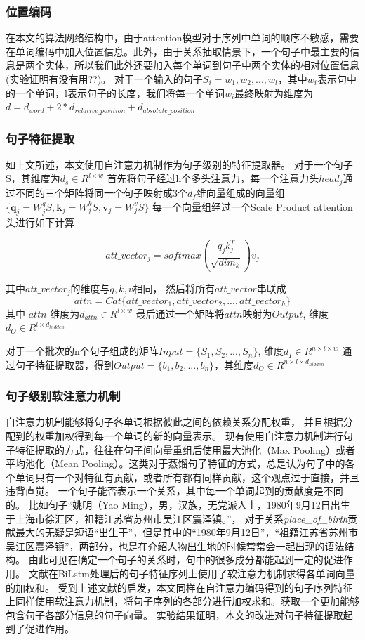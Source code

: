 \documentclass[UTF8]{csoarticle}
\begin{document}
\subsubsection{位置编码}
在本文的算法网络结构中，由于attention模型对于序列中单词的顺序不敏感，需要在单词编码中加入位置信息。此外，由于关系抽取情景下，一个句子中最主要的信息是两个实体，所以我们此外还要加入每个单词到句子中两个实体的相对位置信息(实验证明有没有用??)。
对于一个输入的句子$S_i={w_1, w_2, ..., w_l}$，其中$w_i$表示句中的一个单词，l表示句子的长度，我们将每一个单词$w_i$最终映射为维度为$ d=d_{word} + 2*d_{relative\_position} + d_{absolute\_position}$

\subsubsection{句子特征提取}

如上文所述，本文使用自注意力机制作为句子级别的特征提取器。
对于一个句子S，其维度为$d_s\in R^{l\times w}$
首先将句子经过h个多头注意力，每一个注意力头$head_j$通过不同的三个矩阵将同一个句子映射成3个$d_{f}$维向量组成的向量组$\{\boldsymbol q_j=W_j^{q}S, \boldsymbol k_j=W_j^{k}S, \boldsymbol v_j=W_j^{v}S\}$
每一个向量组经过一个Scale Product attention头进行如下计算

\[ att\_vector_{j} = softmax(\frac{q_{j} k_{j}^{T} }{\sqrt{dim_k}})v_{j}\]

其中$att\_vector_j$的维度与$q, k, v$相同，
然后将所有$att\_vector$串联成
\[attn = Cat\{att\_vector_1,att\_vector_2,...,att\_vector_h\}\]
其中 $attn$ 维度为$d_{attn} \in R^{l\times w}$
最后通过一个矩阵将$attn$映射为$Output$, 维度$d_{O} \in R^{l\times d_{hidden}}$

对于一个批次的n个句子组成的矩阵$Input=\{S_1, S_2,...,S_n\}$, 维度$d_{I} \in R^{n\times l\times w}$
通过句子特征提取器，得到$Output=\{b_1, b_2,...,b_n\}$，其维度$d_{O} \in R^{n\times l\times  d_{hidden}}$

\subsubsection{句子级别软注意力机制}
自注意力机制能够将句子各单词根据彼此之间的依赖关系分配权重，
并且根据分配到的权重加权得到每一个单词的新的向量表示。
现有使用自注意力机制进行句子特征提取的方式，往往在句子间向量重组后使用最大池化（Max Pooling）或者平均池化（Mean Pooling）。这类对于蒸馏句子特征的方式，总是认为句子中的各个单词只有一个对特征有贡献，或者所有都有同样贡献，这个观点过于直接，并且违背直觉。
一个句子能否表示一个关系，其中每一个单词起到的贡献度是不同的。
比如句子“姚明（Yao Ming），男，汉族，无党派人士，1980年9月12日出生于上海市徐汇区，祖籍江苏省苏州市吴江区震泽镇。”，
对于关系\textit{place\_of\_birth}贡献最大的无疑是短语“出生于”，但是其中的“1980年9月12日”，“祖籍江苏省苏州市吴江区震泽镇”，两部分，也是在介绍人物出生地的时候常常会一起出现的语法结构。
由此可见在确定一个句子的关系时，句中的很多成分都能起到一定的促进作用。
文献\cite{bib4}在BiLstm处理后的句子特征序列上使用了软注意力机制求得各单词向量的加权和。
受到上述文献的启发，本文同样在自注意力编码得到的句子序列特征上同样使用软注意力机制，将句子序列的各部分进行加权求和。获取一个更加能够包含句子各部分信息的句子向量。
实验结果证明，本文的改进对句子特征提取起到了促进作用。
\end{document}
